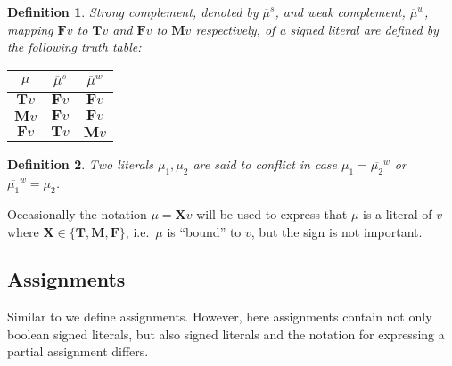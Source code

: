 \documentclass{vutinfth} %
\newtheorem{definition}{Definition}[section]
\newcommand{\mbt}{must-be-true}
\newcommand{\negstrong}[1]{\overline{#1}^s}
\newcommand{\negweak}[1]{\overline{#1}^w}
\newcommand{\bT}{\mathbf{T}}
\newcommand{\bM}{\mathbf{M}}
\newcommand{\bF}{\mathbf{F}}
\newcommand{\bX}{\mathbf{X}}
\newcommand{\sgl}{\mu}
\newcommand{\bsgl}{\sigma}
\newcommand{\thrice}{{\{\bT, \bM, \bF \}}}
\newcommand{\wkn}{\textit{weaken}}
\begin{document}


\begin{definition}
Strong complement, denoted by $\negstrong{\sgl}$, and weak complement, $\negweak{\sgl}$, mapping $\bF v$ to $\bT v$ and $\bF v$ to $\bM v$ respectively, of a signed literal are defined by the following truth table:%

\begin{center}
\begin{tabular}{|c|cc|}
\hline
$\sgl$&$\negstrong{\sgl}$&$\negweak{\sgl}$\\
\hline
\hline
$\bT v$&$\bF v$&$\bF v$\\
$\bM v$&$\bF v$&$\bF v$\\
$\bF v$&$\bT v$&$\bM v$\\
\hline
\end{tabular}
\end{center}
\end{definition}

\begin{definition}
Two literals $\sgl_1, \sgl_2$ are said to \emph{conflict} in case $\sgl_1 = \negweak{\sgl_2}$ or $\negweak{\sgl_1} = \sgl_2$.
\end{definition}

Occasionally the notation $\sgl = \bX v$ will be used to express that $\sgl$ is a literal of $v$ where $\bX \in \thrice$, i.e.~$\sgl$ is \enquote{bound} to $v$, but the sign is not important.

\subsection{Assignments}

Similar to \cite[section 2, p.~3]{clasp} we define assignments. However, here assignments contain not only boolean signed literals, but also signed literals and the notation for expressing a partial assignment differs.
\end{document}
